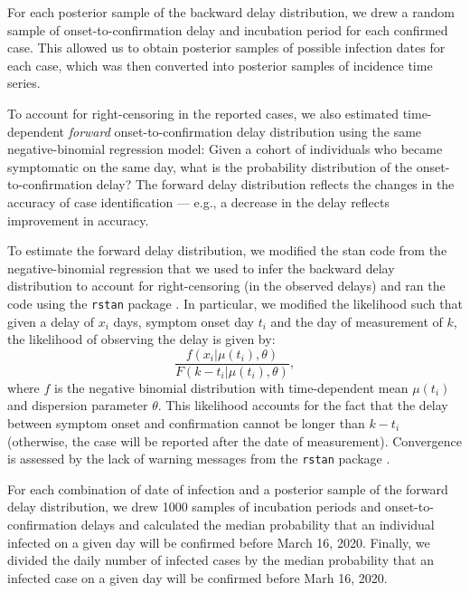 For each posterior sample of the backward delay distribution, we drew a random sample of onset-to-confirmation delay and incubation period for each confirmed case. 
This allowed us to obtain posterior samples of possible infection dates for each case,
which was then converted into posterior samples of incidence time series.

To account for right-censoring in the reported cases, we also estimated time-dependent \emph{forward} onset-to-confirmation delay distribution using the same negative-binomial regression model: Given a cohort of individuals who became symptomatic on the same day, what is the probability distribution of the onset-to-confirmation delay?
The forward delay distribution reflects the changes in the accuracy of case identification --- e.g., a decrease in the delay reflects improvement in accuracy.

To estimate the forward delay distribution, we modified the stan code from the negative-binomial regression that we used to infer the backward delay distribution to account for right-censoring (in the observed delays) and ran the code using the \texttt{rstan} package \citep{rstan}.
In particular, we modified the likelihood such that given a delay of $x_i$ days, symptom onset day $t_i$ and the day of measurement of $k$, the likelihood of observing the delay is given by:
\begin{equation}
\frac{f(x_i|\mu(t_i), \theta)}{F(k-t_i|\mu(t_i), \theta)},
\end{equation}
where $f$ is the negative binomial distribution with time-dependent mean $\mu(t_i)$ and dispersion parameter $\theta$. This likelihood accounts for the fact that the delay between symptom onset and confirmation cannot be longer than $k-t_i$ (otherwise, the case will be reported after the date of measurement). Convergence is assessed by the lack of warning messages from the \texttt{rstan} package \citep{rstan}.

For each combination of date of infection and a posterior sample of the forward delay distribution, we drew 1000 samples of incubation periods and onset-to-confirmation delays and calculated the median probability that an individual infected on a given day will be confirmed before March 16, 2020.
Finally, we divided the daily number of infected cases by the median probability that an infected case on a given day will be confirmed before Marh 16, 2020.

\pagebreak


